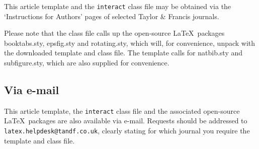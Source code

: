 \documentclass[]{interact}
\theoremstyle{plain}%
\theoremstyle{definition}
\theoremstyle{remark}
\begin{document}
This article template and the \texttt{interact} class file may be obtained via the `Instructions for Authors' pages of selected Taylor \& Francis journals.

Please note that the class file calls up the open-source \LaTeX\ packages booktabs.sty, epsfig.sty and rotating.sty, which will, for convenience, unpack with the downloaded template and class file. The template calls for natbib.sty and subfigure.sty, which are also supplied for convenience.


\subsection{Via e-mail}

This article template, the \texttt{interact} class file and the associated open-source \LaTeX\ packages are also available via e-mail. Requests should be addressed to \texttt{latex.helpdesk@tandf.co.uk}, clearly stating for which journal you require the template and class file.
\end{document}

